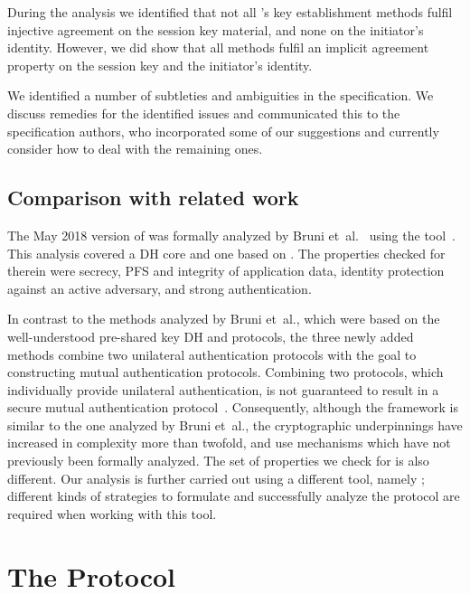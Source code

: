 \documentclass[runningheads, envcountsame, hidelinks, a4paper, draft, x11names]{llncs}
\begin{document}
During the analysis we identified that not all \mEdhoc{}'s key establishment
methods fulfil injective agreement on the session key material, and none
on the initiator's identity.
%
However, we did show that all methods fulfil an implicit agreement property on
the session key and the initiator's identity.

We identified a number of subtleties and ambiguities in the specification.
%
We discuss remedies for the identified issues and
communicated this to the specification authors, who incorporated some of our
suggestions and currently consider how to deal with the remaining ones.
%

\subsection{Comparison with related work}
The May 2018 version of \mEdhoc{} was formally analyzed by
Bruni et~al.~\cite{DBLP:conf/secsr/BruniJPS18} using the \mProverif{}
tool~\cite{DBLP:conf/csfw/Blanchet01}.
%
This analysis covered a DH core and one based on \mSigma.
%
The properties checked for therein were secrecy, PFS and integrity of
application data, identity protection against an active adversary,
and strong authentication.
%

%
In contrast to the methods analyzed by Bruni et~al., which were based on the
well-understood pre-shared key DH and \mSigma protocols, the three newly added
methods combine two unilateral authentication protocols with the goal to
constructing mutual authentication protocols.
%
Combining two protocols, which individually provide unilateral authentication,
is not guaranteed to result in a secure mutual authentication
protocol~\cite{DBLP:conf/ccs/Krawczyk16}.
%
Consequently, although the framework is similar to the one analyzed by Bruni
et~al., the cryptographic underpinnings have increased in complexity more than
twofold, and use mechanisms which have not previously been formally analyzed.
%
The set of properties we check for is also different.
%
Our analysis is further carried out using a different tool,
namely \mTamarin; different kinds of strategies to formulate and
successfully analyze the protocol are required when working with this tool.
%

\section{The \mEdhoc{} Protocol}
\label{sec:edhoc}

\end{document}
